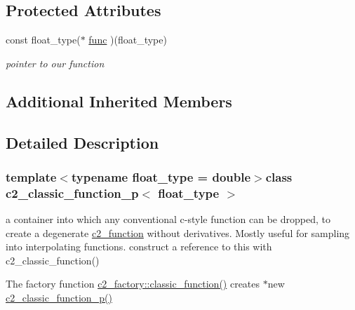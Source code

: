 \subsection*{Protected Attributes}
\begin{DoxyCompactItemize}
\item 
\hypertarget{classc2__classic__function__p_a1ff2ac38a9a119e6f68ef44bb382ece7}{const float\-\_\-type($\ast$ \hyperlink{classc2__classic__function__p_a1ff2ac38a9a119e6f68ef44bb382ece7}{func} )(float\-\_\-type)}\label{classc2__classic__function__p_a1ff2ac38a9a119e6f68ef44bb382ece7}

\begin{DoxyCompactList}\small\item\em pointer to our function \end{DoxyCompactList}\end{DoxyCompactItemize}
\subsection*{Additional Inherited Members}


\subsection{Detailed Description}
\subsubsection*{template$<$typename float\-\_\-type = double$>$class c2\-\_\-classic\-\_\-function\-\_\-p$<$ float\-\_\-type $>$}

a container into which any conventional c-\/style function can be dropped, to create a degenerate \hyperlink{classc2__function}{c2\-\_\-function} without derivatives. Mostly useful for sampling into interpolating functions. construct a reference to this with c2\-\_\-classic\-\_\-function()

The factory function \hyperlink{classc2__factory_ae5c9140b2bfcc6416682562b99479974}{c2\-\_\-factory\-::classic\-\_\-function()} creates $\ast$new \hyperlink{classc2__classic__function__p_a8b2d09d67a8835902fd6c684d5b183b7}{c2\-\_\-classic\-\_\-function\-\_\-p()} 

